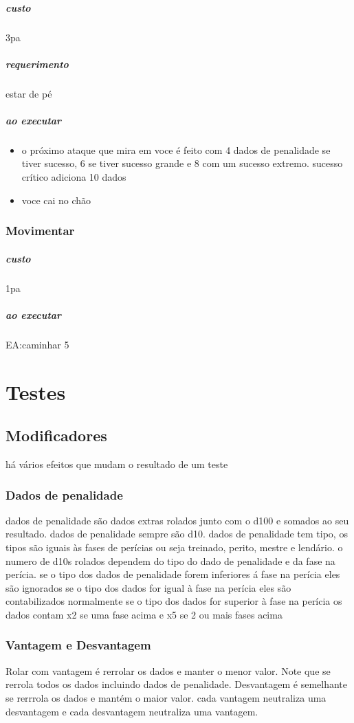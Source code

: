 \paragraph{custo} 3pa
\paragraph{requerimento} estar de pé 
\paragraph{ao executar} 
\begin{itemize}
  \item o próximo ataque que mira em voce é feito com 4 dados de penalidade se tiver sucesso, 
    6 se tiver sucesso grande e 8 com um sucesso extremo. sucesso crítico adiciona 10 dados %
  \item voce cai no chão
\end{itemize}
%
\subsection{Movimentar}
\paragraph{custo} 1pa
\paragraph{ao executar} EA:caminhar 5

%
%
%
%
\chapter{Testes}

\section{Modificadores}
há vários efeitos que mudam o resultado de um teste
\subsection{Dados de penalidade}
dados de penalidade são dados extras rolados junto com o d100 e somados ao seu resultado. 
dados de penalidade sempre são d10.
dados de penalidade tem tipo, os tipos são iguais às fases de perícias 
ou seja treinado, perito, mestre e lendário.
o numero de d10s rolados dependem do tipo do dado de penalidade e da fase na perícia.
se o tipo dos dados de penalidade forem inferiores á fase na perícia eles são ignorados
se o tipo dos dados for igual à fase na perícia eles são contabilizados normalmente
se o tipo dos dados for superior à fase na perícia os dados contam x2 se uma fase acima
e x5 se 2 ou mais fases acima
\subsection{Vantagem e Desvantagem}
Rolar com vantagem é rerrolar os dados e manter o menor valor.
Note que se rerrola todos os dados incluindo dados de penalidade.
Desvantagem é semelhante  se rerrrola os dados e mantém o maior valor.
cada vantagem neutraliza uma desvantagem e cada desvantagem neutraliza uma vantagem.

